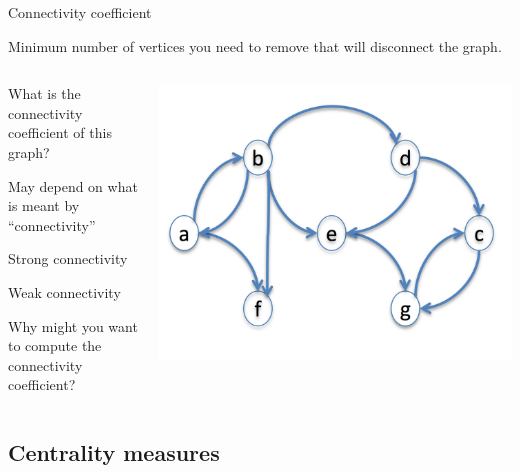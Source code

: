 \begin{frame}{Connectivity coefficient}

\begin{definition}
Minimum number of vertices you need to remove that will disconnect the graph.
\end{definition}


\begin{columns}
	\begin{column}{0.5\textwidth}
		\BI
		\item What is the connectivity coefficient of this graph?
		\item May depend on what is meant by “connectivity”
		\BI
		\item Strong connectivity
		\item Weak connectivity
		\EI
		\item Why might you want to compute the connectivity coefficient?
		\EI
	\end{column}
	\begin{column}{0.5\textwidth}
		\includegraphics[width=\textwidth]{figs/xx/connectivity.png}
	\end{column}
\end{columns}



	

\end{frame}

\subsection{Centrality measures}



